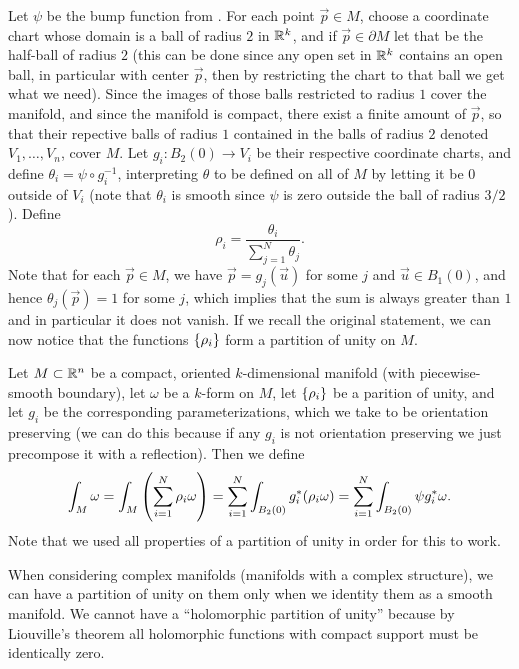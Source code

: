 \documentclass[11pt,a4paper]{article}
\begin{document}
\begin{proofof}{}
  Let $\psi$ be the bump function from .
  For each point $\vec p \in M$,
  choose a coordinate chart whose domain is a ball of radius $2$ in $\mathbb{R}^k$,
  and if $\vec p \in \partial M$ let that be the half-ball of radius $2$
  (this can be done since any open set in $\mathbb{R}^k$ contains an open ball,
  in particular with center $\vec p$, then by restricting the chart to
  that ball we get what we need).
  Since the images of those balls restricted to radius $1$ cover the
  manifold, and since the manifold is compact,
  there exist a finite amount of $\vec p$,
  so that their repective balls of radius $1$ 
  contained in the balls of radius $2$ denoted $V_1,\dots,V_n$,
  cover $M$.
  Let $g_i \colon B_2(0) \to V_i$ be their respective coordinate charts,
  and define $\theta_i = \psi \circ g_i^{-1}$,
  interpreting $\theta$ to be defined on all of $M$ by letting it
  be $0$ outside of $V_i$ (note that $\theta_i$ is smooth since $\psi$
  is zero outside the ball of radius $3/2$).
  Define
  \[
    \rho_i =
    \frac{\theta_i}{\sum_{j=1}^{N} \theta_j}.
  \]
  Note that for each $\vec p \in M$,
  we have $\vec p = g_j(\vec u)$ for some $j$ and $\vec u \in B_1(0)$,
  and hence $\theta_j(\vec p) = 1$ for some $j$,
  which implies that the sum is always greater than $1$ and in particular
  it does not vanish.
  If we recall the original statement, we can now notice that
  the functions $\left\{\rho_i\right\}$ form a partition of unity on $M$.
\end{proofof}

\begin{remark}
  Let $M \subset \mathbb{R}^n$ be a compact, oriented $k$-dimensional manifold
  (with piecewise-smooth boundary),
  let $\omega$ be a $k$-form on $M$,
  let $\left\{\rho_i\right\}$ be a parition of unity,
  and let $g_i$ be the corresponding parameterizations,
  which we take to be orientation preserving (we can do this
  because if any $g_i$ is not orientation preserving we just precompose
  it with a reflection).
  Then we define
  \[
    \int_M \omega =
    \int_M \del{\sum_{i=1}^{N} \rho_i \omega} =
    \sum_{i=1}^{N} \int_{B_2(0)} g_i^*(\rho_i \omega) =
    \sum_{i=1}^{N} \int_{B_2(0)} \psi g_i^* \omega.
  \]
  Note that we used all properties of a partition of unity in order
  for this to work.
\end{remark}

\begin{remark}
  When considering complex manifolds (manifolds with a complex structure),
  we can have a partition of unity on them only when we identity them
  as a smooth manifold.
  We cannot have a ``holomorphic partition of unity'' because
  by Liouville's theorem all holomorphic functions with compact support
  must be identically zero.
\end{remark}
\end{document}
